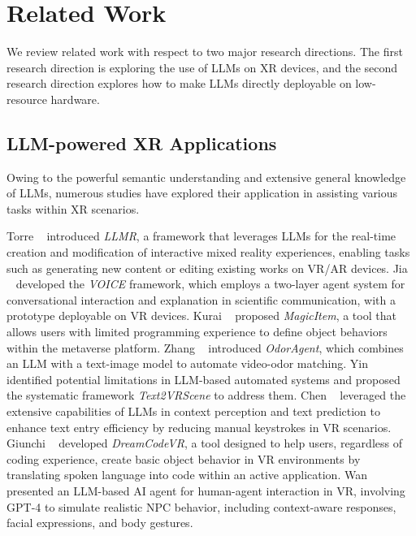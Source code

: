 \section{Related Work}
\label{sec:related-work}

We review related work with respect to two major research directions. The first research direction is exploring the use of LLMs on XR devices, and the second research direction explores how to make LLMs directly deployable on low-resource hardware.

\subsection{LLM-powered XR Applications}
Owing to the powerful semantic understanding and extensive general knowledge of LLMs, numerous studies have explored their application in assisting various tasks within XR scenarios. 

Torre \etal~\cite{de2024llmr} introduced \emph{LLMR}, a framework that leverages LLMs for the real-time creation and modification of interactive mixed reality experiences, enabling tasks such as generating new content or editing existing works on VR/AR devices. Jia \etal~\cite{Jia2024_1} developed the \emph{VOICE} framework, which employs a two-layer agent system for conversational interaction and explanation in scientific communication, with a prototype deployable on VR devices. Kurai \etal~\cite{kurai2024magicitem} proposed \emph{MagicItem}, a tool that allows users with limited programming experience to define object behaviors within the metaverse platform. Zhang \etal~\cite{zhang2024odoragent} introduced \emph{OdorAgent}, which combines an LLM with a text-image model to automate video-odor matching. Yin \etal~\cite{yin2024text2vrscene} identified potential limitations in LLM-based automated systems and proposed the systematic framework \emph{Text2VRScene} to address them. Chen \etal~\cite{chen2024supporting} leveraged the extensive capabilities of LLMs in context perception and text prediction to enhance text entry efficiency by reducing manual keystrokes in VR scenarios. Giunchi \etal~\cite{giunchi2024dreamcodevr} developed \emph{DreamCodeVR}, a tool designed to help users, regardless of coding experience, create basic object behavior in VR environments by translating spoken language into code within an active application. Wan \etal~\cite{wan2024building} presented an LLM-based AI agent for human-agent interaction in VR, involving GPT-4 to simulate realistic NPC behavior, including context-aware responses, facial expressions, and body gestures.

